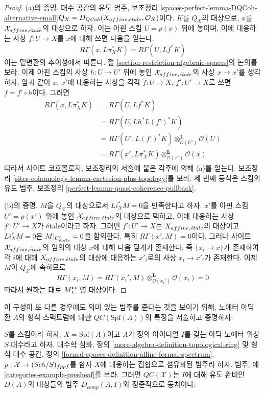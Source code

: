 \begin{proof}
\medskip\noindent
 (a)의 증명. 대수 공간의 유도 범주, 보조정리
\ref{spaces-perfect-lemma-DQCoh-alternative-small}\linebreak[1]
 $Q_X = D_{\mathit{QCoh}}(X_{affine, {\acute{e}tale}}, \mathcal{O}_X)$이다.
$K$를 $Q_X$의 대상으로, $x$를
$\mathcal{X}_{affine, {\acute{e}tale}}$의 대상으로 하자. 이는 아핀
스킴 $U = p(x)$ 위에 놓이며, 이에 대응하는 사상
$f : U \to X$를 $x$에 대해 쓰면 다음을 얻는다.
$$
R\Gamma(x, L\pi_X^*K) = R\Gamma(U, Lf^*K)
$$
이는 밑변환의 추이성에서 따른다. 절
\ref{section-restriction-algebraic-spaces}의 논의를 보라.
이제 아핀 스킴의 사상 $h : U \to U'$ 위에 놓인
$\mathcal{X}_{affine, {\acute{e}tale}}$의 사상 $x \to x'$를 생각하자.
앞과 같이 $x$, $x'$에 대응하는 사상을 각각 $f : U \to X$,
$f' : U' \to X$로 쓰면 $f = f' \circ h$이다. 그러면
\begin{align*}
R\Gamma(x, L\pi_X^*K)
& =
R\Gamma(U, Lf^*K) \\
& =
R\Gamma(U, Lh^*L(f')^*K) \\
& =
R\Gamma(U', L(f')^*K) \otimes_{\mathcal{O}(U')}^\mathbf{L} \mathcal{O}(U) \\
& =
R\Gamma(x', L\pi_X^*K) \otimes_{\mathcal{O}(x')}^\mathbf{L} \mathcal{O}(x)
\end{align*}
따라서 사이트 코호몰로지, 보조정리의 서술에 붙은 각주에 의해 (a)를
얻는다. 보조정리
\ref{sites-cohomology-lemma-cartesion-plus-topology}를 보라. 세 번째
등식은 스킴의 유도 범주, 보조정리
\ref{perfect-lemma-quasi-coherence-pullback}.

\medskip\noindent
 (b)의 증명. $M$을 $Q_\mathcal{X}$의 대상으로서 $Li_X^*M = 0$을
만족한다고 하자. $x'$를 아핀 스킴 $U' = p(x')$ 위에 놓인
$\mathcal{X}_{affine, {\acute{e}tale}}$의 대상으로 택하고, 이에 대응하는
사상 $f' : U' \to X$가 \'etale이라고 하자. 그러면
$f' : U' \to X$는 $X_{affine, {\acute{e}tale}}$의 대상이고
$Li_X^*M = 0$은 $M|_{U'_{\acute{e}tale}} = 0$을 함의한다.
특히 $R\Gamma(x', M) = 0$이다. 그러나 사이트
$\mathcal{X}_{affine, {\acute{e}tale}}$의 임의의 대상 $x$에 대해 다음 덮개가
존재한다. 즉 $\{x_i \to x\}$가 존재하여 각 $i$에 대해
$X_{affine, {\acute{e}tale}}$의 대상에 대응하는 $x'_i$로의 사상
$x_i \to x'_i$가 존재한다. 이제 $M$이 $Q_\mathcal{X}$에 속하므로
$$
R\Gamma(x_i, M) =
R\Gamma(x_i', M) \otimes_{\mathcal{O}(x_i')}^\mathbf{L} \mathcal{O}(x_i) =
0
$$
따라서 원하는 대로 $M$은 영 대상이다.
\end{proof}

\noindent
이 구성이 또 다른 경우에도 의미 있는 범주를 준다는 것을 보이기 위해,
노에터 아딕 환 $A$의 형식 스펙트럼에 대한
$\mathit{QC}(\text{Spf}(A))$의 특징을 서술하고 증명하자.

\begin{proposition}
\label{proposition-QC-derived-complete}
 $S$를 스킴이라 하자. $X = \text{Spf}(A)$이고 $A$가 정의 아이디얼
$I$를 갖는 아딕 노에터 위상 $S$-대수라고 하자. 대수학 심화, 정의
\ref{more-algebra-definition-topological-ring} 및 형식 대수 공간, 정의
\ref{formal-spaces-definition-affine-formal-spectrum}.
 $p : \mathcal{X} \to (\mathit{Sch}/S)_{fppf}$를 함자 $X$에 대응하는
집합으로 섬유화된 범주라 하자. 범주, 예
\ref{categories-example-presheaf}를 보라. 그러면
$\mathit{QC}(\mathcal{X})$는 $I$에 대해 유도 완비인 $D(A)$의 대상들의
범주 $D_{comp}(A, I)$와 정준적으로 동치이다.
\end{proposition}


